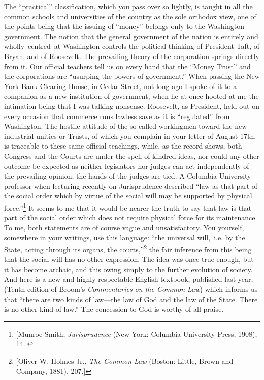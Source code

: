 \documentclass[openany,nobib]{tufte-book}
\begin{document}
The ``practical'' classification, which you pass over so lightly, is
taught in all the common schools and universities of the country as the
sole orthodox view, one of the points being that the issuing of
``money'' belongs only to the Washington government. The notion that the
general government of the nation is entirely and wholly~centred~at
Washington controls the political thinking of President Taft, of Bryan,
and of Roosevelt. The prevailing theory of the corporation springs
directly from it. Our official teachers tell us on every hand that the
``Money Trust'' and the corporations are ``usurping the powers of
government.'' When passing the New York Bank Clearing House, in Cedar
Street, not long ago I spoke of it to a companion as a new institution
of government, when he at once hooted at me the intimation being that I
was talking nonsense. Roosevelt, as President, held out on every
occasion that commerce runs lawless save as it is ``regulated'' from
Washington. The hostile attitude of the so-called workingmen toward the
new industrial unities or Trusts, of which you complain in your letter
of August 17th, is traceable to these same official teachings, while, as
the record shows, both Congress and the Courts are under the spell of
kindred ideas, nor could any other outcome be expected as neither
legislators nor judges can act independently of the prevailing opinion;
the hands of the judges are tied. A Columbia University professor when
lecturing recently on Jurisprudence described ``law as that part of the
social order which by virtue of the social will may be supported by
physical force.''\footnote{{[}Munroe Smith, \emph{Jurisprudence} (New
  York: Columbia University Press, 1908), 14.{]}} It seems to me that it
would be nearer the truth to say that law is that part of the social
order which does not require physical force for its maintenance. To me,
both statements are of course vague and unsatisfactory. You yourself,
somewhere in your writings, use this language: ``the universal
will,~i.e. by the State, acting through its organs, the
courts,''\footnote{{[}Oliver W. Holmes Jr., \emph{The Common Law}
  (Boston: Little, Brown and Company, 1881), 207.{]}} the fair inference
from this being that the social will has no other expression. The idea
was once true enough, but it has become archaic, and this owing simply
to the further evolution of society. And here is a new and highly
respectable English textbook, published last year, (Tenth edition of
Broom's \emph{Commentaries on the Common Law}) which informs us that
``there are two kinds of law---the law of God and the law of the State.
There is no other kind of law.'' The concession to God is worthy of all
praise.~
\end{document}
